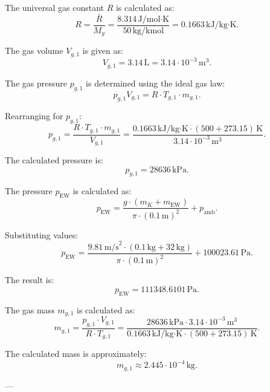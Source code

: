 The universal gas constant \( R \) is calculated as:  
\[
R = \frac{\bar{R}}{M_g} = \frac{8.314 \, \text{J/mol·K}}{50 \, \text{kg/kmol}} = 0.1663 \, \text{kJ/kg·K}.
\]

The gas volume \( V_{g,1} \) is given as:  
\[
V_{g,1} = 3.14 \, \text{L} = 3.14 \cdot 10^{-3} \, \text{m}^3.
\]

The gas pressure \( p_{g,1} \) is determined using the ideal gas law:  
\[
p_{g,1} V_{g,1} = R \cdot T_{g,1} \cdot m_{g,1}.
\]

Rearranging for \( p_{g,1} \):  
\[
p_{g,1} = \frac{R \cdot T_{g,1} \cdot m_{g,1}}{V_{g,1}} = \frac{0.1663 \, \text{kJ/kg·K} \cdot (500 + 273.15) \, \text{K}}{3.14 \cdot 10^{-3} \, \text{m}^3}.
\]

The calculated pressure is:  
\[
p_{g,1} = 28636 \, \text{kPa}.
\]

The pressure \( p_{\text{EW}} \) is calculated as:  
\[
p_{\text{EW}} = \frac{g \cdot (m_K + m_{\text{EW}})}{\pi \cdot (0.1 \, \text{m})^2} + p_{\text{amb}}.
\]

Substituting values:  
\[
p_{\text{EW}} = \frac{9.81 \, \text{m/s}^2 \cdot (0.1 \, \text{kg} + 32 \, \text{kg})}{\pi \cdot (0.1 \, \text{m})^2} + 100023.61 \, \text{Pa}.
\]

The result is:  
\[
p_{\text{EW}} = 111348.6101 \, \text{Pa}.
\]

The gas mass \( m_{g,1} \) is calculated as:  
\[
m_{g,1} = \frac{p_{g,1} \cdot V_{g,1}}{R \cdot T_{g,1}} = \frac{28636 \, \text{kPa} \cdot 3.14 \cdot 10^{-3} \, \text{m}^3}{0.1663 \, \text{kJ/kg·K} \cdot (500 + 273.15) \, \text{K}}.
\]

The calculated mass is approximately:  
\[
m_{g,1} \approx 2.445 \cdot 10^{-4} \, \text{kg}.
\]

---